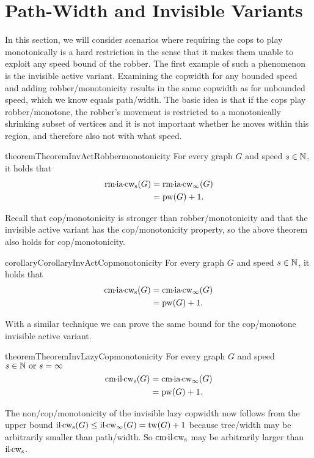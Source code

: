 \section{Path-Width and Invisible Variants} 
\label{MoreNonmonotonicity}
In this section, we will consider scenarios where requiring the cops to play monotonically is a hard restriction in the sense that it makes them unable to exploit any speed bound of the robber.
The first example of such a phenomenon is the invisible active variant.
Examining the copwidth for any bounded speed and adding robber\-/monotonicity results in the same copwidth as for unbounded speed, which we know equals path\-/width.
The basic idea is that if the cops play robber\-/monotone, the robber's movement is restricted to a monotonically shrinking subset of vertices and it is not important whether he moves within this region, and therefore also not with what speed.   

\begin{restatable}{theorem}{TheoremInvActRobbermonotonicity}
    For every graph $G$ and speed $s\in\mathbb{N}$, it holds that
\begin{align*}
    \rmiacopwidth{s}(G) &= \rmiacopwidth{\infty}(G) \\
    &= \pw(G) + 1.
\end{align*}
\end{restatable}
Recall that cop\-/monotonicity is stronger than robber\-/monotonicity and that the invisible active variant has the cop\-/monotonicity property, so the above theorem also holds for cop\-/monotonicity.
\begin{restatable}{corollary}{CorollaryInvActCopmonotonicity}
    For every graph $G$ and speed $s\in \mathbb{N}$, it holds that
\begin{align*}
    \cmiacopwidth{s}(G) &= \cmiacopwidth{\infty}(G)\\
    &= \pw(G) + 1.
\end{align*}
\end{restatable}

With a similar technique we can prove the same bound for the cop\-/monotone invisible active variant.
\begin{restatable}{theorem}{TheoremInvLazyCopmonotonicity}
 For every graph $G$ and speed $s\in \mathbb{N} \text{ or } s=\infty$
\begin{align*}
    \cmilcopwidth{s}(G) &= \cmiacopwidth{\infty}(G)\\
    &= \pw(G) + 1.
\end{align*}
\end{restatable}
The non\-/cop\-/monotonicity of the invisible lazy copwidth now follows from the upper bound $\ilcopwidth{s}(G) \leq \ilcopwidth{\infty}(G) =\tw(G)+1$ because tree\-/width may be arbitrarily smaller than path\-/width. So $\cmilcopwidth{s}$ may be arbitrarily larger than $\ilcopwidth{s}$.

